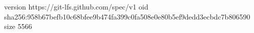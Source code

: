 version https://git-lfs.github.com/spec/v1
oid sha256:958b67befb10c68bfee9b474fa399c0fa508e0e80b5ef9dedd3ecbdc7b806590
size 5566
